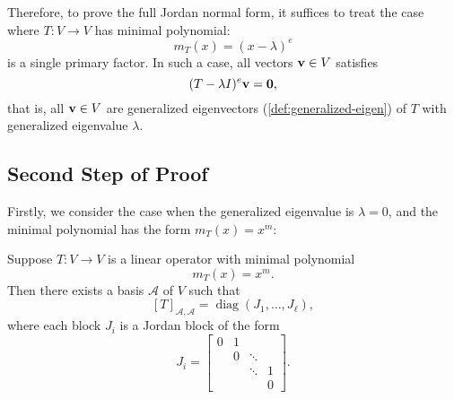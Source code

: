 \medskip

Therefore, to prove the full Jordan normal form, it suffices to treat the case where $T:V \to V$ has minimal polynomial:
\[
m_T(x) = (x - \lambda)^e
\]
is a single primary factor. In such a case, all vectors ${\bf v} \in V$ satisfies
$$(T-\lambda I)^e{\bf v} = {\bf 0},$$
that is, all ${\bf v} \in V$ are generalized eigenvectors (\autoref{def:generalized-eigen}) of $T$ with generalized eigenvalue $\lambda$.

\subsection{Second Step of Proof}
Firstly, we consider the case when the generalized eigenvalue is $\lambda = 0$, and the minimal polynomial has the form \(m_T(x) = x^m\):
\begin{proposition}\label{prop:jordan-nilpotent}
Suppose \( T : V \to V \) is a linear operator with minimal polynomial
\[
m_T(x) = x^m.
\]
Then there exists a basis \( \mathcal{A} \) of \( V \) such that
\[
[T]_{\mathcal{A},\mathcal{A}} = \operatorname{diag}(J_1, \ldots, J_\ell),
\]
where each block \( J_i \) is a Jordan block of the form
\[
J_i = \begin{bmatrix}
0 & 1 &        &        \\
  & 0 & \ddots &        \\
  &   & \ddots & 1      \\
  &   &        & 0
\end{bmatrix}.
\]
\end{proposition}

